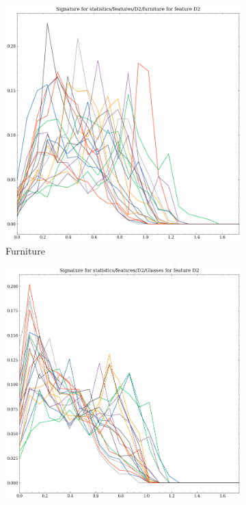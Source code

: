 \begin{figure}[t!p]
    \begin{subfigure}[b]{0.23\textwidth}
        \includegraphics[width=\textwidth]{assets/feature_extraction/D2/furniture.png}
        \caption{Furniture}
    \end{subfigure}
    \hfill
    \begin{subfigure}[b]{0.23\textwidth}
        \includegraphics[width=\textwidth]{assets/feature_extraction/D2/Glasses.png}

\end{subfigure}
\end{figure}
